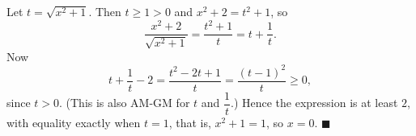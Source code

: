 Let $t=\sqrt{x^2+1}$. Then $t\ge1>0$ and $x^2+2=t^2+1$, so
\[\dfrac{x^2+2}{\sqrt{x^2+1}}=\dfrac{t^2+1}{t}=t+\dfrac{1}{t} .\]
Now
\[t+\dfrac{1}{t}-2=\dfrac{t^2-2t+1}{t}=\dfrac{(t-1)^2}{t}\ge0,\]
since $t>0$. (This is also AM-GM for $t$ and $\dfrac{1}{t}$.) Hence the expression is at least $2$, with equality exactly when $t=1$, that is, $x^2+1=1$, so $\boxed{x=0}$. $\blacksquare$
